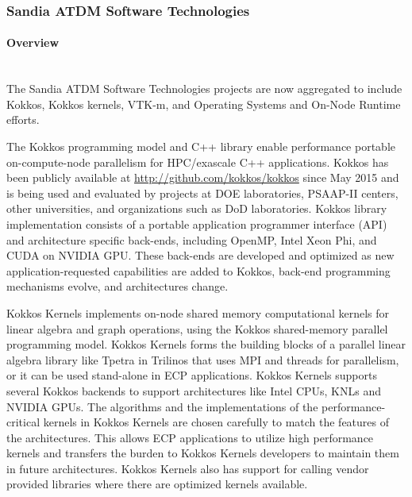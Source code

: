 \subsubsection{ Sandia ATDM Software Technologies}

\paragraph{Overview} \leavevmode \\

The Sandia ATDM Software Technologies projects are now aggregated to include Kokkos, Kokkos kernels, VTK-m, and Operating Systems and On-Node Runtime efforts. 

The Kokkos programming model and C++ library enable performance portable on-compute-node parallelism for HPC/exascale C++ applications. Kokkos has been publicly available at \url{http://github.com/kokkos/kokkos} since May 2015 and is being used and evaluated by projects at DOE laboratories, PSAAP-II centers, other universities, and organizations such as DoD laboratories. Kokkos library implementation consists of a portable application programmer interface (API) and architecture specific back-ends, including OpenMP, Intel Xeon Phi, and CUDA on NVIDIA GPU. These back-ends are developed and optimized as new application-requested capabilities are added to Kokkos, back-end programming mechanisms evolve, and architectures change.

Kokkos Kernels implements on-node shared memory computational kernels for linear algebra and graph operations, using the Kokkos shared-memory parallel programming model. Kokkos Kernels forms the building blocks of a parallel linear algebra library like Tpetra in Trilinos that uses MPI and threads for parallelism, or it can be used stand-alone in ECP applications. Kokkos Kernels supports several Kokkos backends to support architectures like Intel CPUs, KNLs and NVIDIA GPUs. The algorithms and the implementations of the performance-critical kernels in Kokkos Kernels are chosen carefully to match the features of the architectures. This allows ECP applications to utilize high performance kernels and transfers the burden to Kokkos Kernels developers to maintain them in future architectures. Kokkos Kernels also has support for calling vendor provided libraries where there are optimized kernels available.

